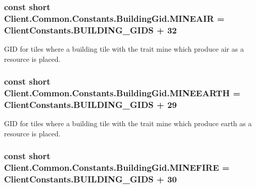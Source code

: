 \subsubsection[{M\+I\+N\+E\+A\+I\+R}]{\setlength{\rightskip}{0pt plus 5cm}const short Client.\+Common.\+Constants.\+Building\+Gid.\+M\+I\+N\+E\+A\+I\+R = {\bf Client\+Constants.\+B\+U\+I\+L\+D\+I\+N\+G\+\_\+\+G\+I\+D\+S} + 32}\label{classClient_1_1Common_1_1Constants_1_1BuildingGid_a9bf32b9e9f5bfe9e624c4629836c31fd}


G\+I\+D for tiles where a building tile with the trait mine which produce air as a resource is placed. 

\hypertarget{classClient_1_1Common_1_1Constants_1_1BuildingGid_a57aa9dce96f92143d655a10db1ed9176}{}
\subsubsection[{M\+I\+N\+E\+E\+A\+R\+T\+H}]{\setlength{\rightskip}{0pt plus 5cm}const short Client.\+Common.\+Constants.\+Building\+Gid.\+M\+I\+N\+E\+E\+A\+R\+T\+H = {\bf Client\+Constants.\+B\+U\+I\+L\+D\+I\+N\+G\+\_\+\+G\+I\+D\+S} + 29}\label{classClient_1_1Common_1_1Constants_1_1BuildingGid_a57aa9dce96f92143d655a10db1ed9176}


G\+I\+D for tiles where a building tile with the trait mine which produce earth as a resource is placed. 

\hypertarget{classClient_1_1Common_1_1Constants_1_1BuildingGid_a14b7f89faee6a0b0f80269398bae672b}{}
\subsubsection[{M\+I\+N\+E\+F\+I\+R\+E}]{\setlength{\rightskip}{0pt plus 5cm}const short Client.\+Common.\+Constants.\+Building\+Gid.\+M\+I\+N\+E\+F\+I\+R\+E = {\bf Client\+Constants.\+B\+U\+I\+L\+D\+I\+N\+G\+\_\+\+G\+I\+D\+S} + 30}\label{classClient_1_1Common_1_1Constants_1_1BuildingGid_a14b7f89faee6a0b0f80269398bae672b}


